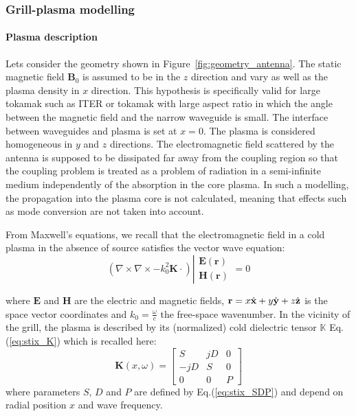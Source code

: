 \subsubsection{Grill-plasma modelling}\label{sec:grill_modeling}

\paragraph{Plasma description}\label{sec:dielectric_tensor}

Lets consider the geometry shown in Figure~\ref{fig:geometry_antenna}. The static magnetic field $\mathbf{B}_{0}$ is assumed to be in the $z$ direction and vary as well as the plasma density in $x$ direction. This hypothesis is specifically valid for large tokamak such as ITER or tokamak with large aspect ratio in which the angle between the magnetic field and the narrow waveguide is small. The interface between waveguides and plasma is set at $x=0$. The plasma is considered homogeneous
in $y$ and $z$ directions. The electromagnetic field scattered by the antenna is supposed to be dissipated far away from the coupling region so that the coupling problem is treated as a problem of radiation in a semi-infinite medium independently of the absorption in the core plasma. In such a modelling, the propagation into the plasma core is not calculated, meaning that effects such as mode conversion are not taken into account. 

From Maxwell's equations, we recall that the electromagnetic field in a cold plasma in the absence of source satisfies the vector wave equation:
\begin{equation}
\left(\nabla\times\nabla\times-k_{0}^{2}\mathbf{K}\cdot\right)\left|\begin{array}{c}
\mathbf{E}(\mathbf{r})\\
\mathbf{H}(\mathbf{r})\end{array}\right.=0
\label{eq:wave_equation}
\end{equation}

where $\mathbf{E}$ and $\mathbf{H}$ are the electric and magnetic fields, $\mathbf{r}=x\mbox{\ensuremath{\hat{\mathbf{x}}}}+y\hat{\mathbf{y}}+z\hat{\mathbf{z}}$ is the space vector coordinates and $k_{0}=\frac{\omega}{c}$ the free-space wavenumber. In the vicinity of the grill, the plasma is described by its (normalized) cold dielectric tensor $\mathbb{K}$ Eq.(\ref{eq:stix_K}) which is recalled here: 
\begin{equation}
	\mathbf{K}(x,\omega)=\left[\begin{array}{ccc}
	S & jD & 0\\
	-jD & S & 0\\
	0 & 0 & P\end{array}\right]
	\label{eq:dielectric_tensor}
\end{equation}
where parameters $S$, $D$ and $P$ are defined by Eq.(\ref{eq:stix_SDP}) and depend on radial position $x$ and wave frequency.

